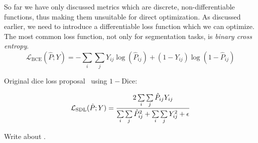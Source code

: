 So far we have only discussed metrics which are discrete, non-differentiable functions, thus making them unsuitable for direct optimization.
As discussed earlier, we need to introduce a differentiable loss function which we can optimize.
The most common loss function, not only for segmentation tasks, is \textit{binary cross entropy}.
%
\begin{equation*}
  \mathcal{L}_{\mathrm{BCE}}(\hat{P}; Y)
  =
  - \sum\limits_i \sum\limits_j
  Y_{ij} \log{(\hat{P}_{ij})}
  +
  (1 - Y_{ij}) \log{(1 - \hat{P}_{ij})}
\end{equation*}

Original dice loss proposal~\cite{original-soft-dice-loss} using $1 - \mathrm{Dice}$:

\begin{equation*}
  \mathcal{L}_{\mathrm{SDL}}(\hat{P}; Y)
  =
  \frac{%
    2 \sum\limits_i \sum\limits_j
    \hat{P}_{ij} Y_{ij}
  }{%
    \sum\limits_i \sum\limits_j \hat{P}_{ij}^2
    +
    \sum\limits_i \sum\limits_j Y_{ij}^2
    +
    \epsilon
  }
\end{equation*}

Write about \cite{soft-losses,generalized-dice-overlap,original-soft-dice-loss}.
